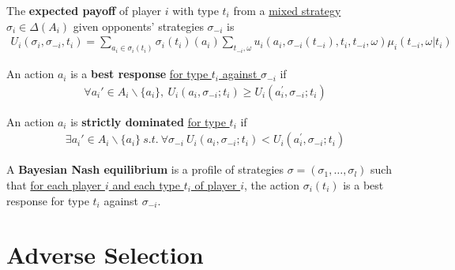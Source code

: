 \documentclass{article}
\begin{document}
   	\begin{definition}[Generalization]
   		The \textbf{expected payoff} of player $i$ with type $t_i$ from a \ul{mixed strategy} $\sigma_i \in \Delta(A_i)$ given opponents' strategies $\sigma_{-i}$ is
   		\begin{align}
   			U_{i}\left(\sigma_{i}, \sigma_{-i}, t_{i}\right)
   			=\sum_{a_i \in \sigma_i(t_i)}
   			\sigma_i(t_i)(a_i) \sum_{t_{-i}, \omega} u_{i}\left(a_{i}, \sigma_{-i}\left(t_{-i}\right), t_{i}, t_{-i}, \omega\right) \mu_{i}\left(t_{-i}, \omega | t_{i}\right)
   		\end{align}
   	\end{definition}
   	
   	\begin{definition}
   		An action $a_i$ is a \textbf{best response} \ul{for type $t_i$ against $\sigma_{-i}$} if
   		\begin{align}
   			\forall a_i' \in A_i \backslash \{a_i\},\ U_{i}\left(a_{i}, \sigma_{-i} ; t_{i}\right) \geq U_{i}\left(a_{i}^{\prime}, \sigma_{-i} ; t_{i}\right)
   		\end{align}
   	\end{definition}
   	
   	\begin{definition}
   		An action $a_i$ is \textbf{strictly dominated} \ul{for type $t_i$} if
   		\begin{align}
   			\exists a_i' \in A_i \backslash \{a_i\}\ s.t.\ \forall \sigma_{-i}\ U_{i}\left(a_{i}, \sigma_{-i} ; t_{i}\right)<U_{i}\left(a_{i}^{\prime}, \sigma_{-i} ; t_{i}\right)
   		\end{align}
   	\end{definition}
   	
   	\begin{definition}
   		A \textbf{Bayesian Nash equilibrium} is a profile of strategies $\sigma=\left(\sigma_{1}, \ldots, \sigma_{l}\right)$ such that \ul{for each player $i$ and each type $t_i$ of player $i$}, the action $\sigma_{i}\left(t_{i}\right)$ is a best response for type $t_{i}$ against $\sigma_{-i}$.
   	\end{definition}
   	
   	\section{Adverse Selection}
\end{document}
